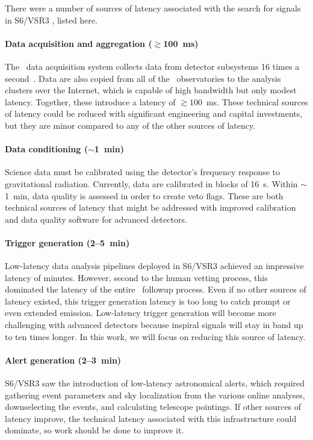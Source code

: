 There were a number of sources of latency associated with the search for
\CBC{} signals in S6/VSR3 \citep{HugheyGWPAW2011}, listed here.

\paragraph{Data acquisition and aggregation ($\gtrsim$100~ms)}%
The \LIGO\ data acquisition system collects data from detector subsystems 16
times a second~\citep{Bork2001}. Data are also copied from all of the \GW\
observatories to the analysis clusters over the Internet, which is capable of
high bandwidth but only modest latency.  Together, these introduce a
latency of $\gtrsim 100$~ms.  These technical sources of latency could be reduced
with significant engineering and capital investments, but they are minor compared
to any of the other sources of latency.

\paragraph{Data conditioning ($\sim$1~min)}%
Science data must be calibrated using the detector's frequency
response to gravitational radiation.  Currently, data are calibrated in blocks of
16~s.  Within $\sim$1~min, data quality is assessed in order to create veto flags.
These are both technical sources of latency that might be addressed with improved
calibration and data quality software for advanced detectors.

\paragraph{Trigger generation (2--5~min)}%
Low-latency data analysis pipelines
deployed in S6/VSR3 achieved an impressive latency of minutes.  However, second
to the human vetting process, this dominated the latency of the entire \EM\
followup process.  Even if no other sources of latency existed, this trigger
generation latency is too long to catch prompt or even extended emission.
Low-latency trigger generation will become more challenging with advanced detectors
because inspiral signals will stay in band up to ten times longer.  In this work,
we will focus on reducing this source of latency.

\paragraph{Alert generation (2--3~min)}%
S6/VSR3 saw the introduction of low-latency astronomical
alerts, which required gathering event parameters and sky localization from the
various online analyses, downselecting the events, and calculating telescope pointings.
If other sources of latency improve, the technical latency associated with this
infrastructure could dominate, so work should be done to improve it.

